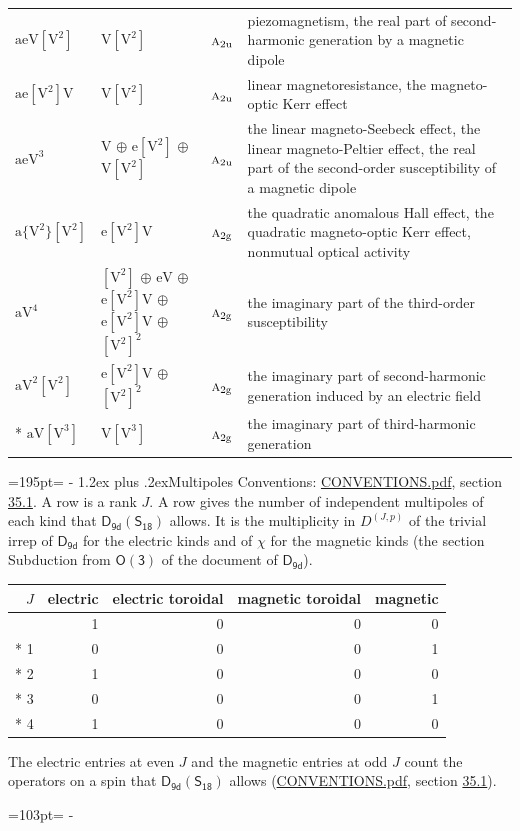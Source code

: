 \documentclass[10pt,a4paper]{article}
\makeatletter
\renewcommand\section{\@startsection{section}{1}{\z@}{-3ex plus -1ex minus -.2ex}%
  {1.2ex plus .2ex}{\normalfont\large\sffamily\bfseries\color{parttitle}}}
\newcommand{\needspace}[1]{\par\penalty-100\begingroup\dimen0=#1\relax\dimen2=\pagegoal
  \advance\dimen2-\pagetotal\ifdim\dimen0>\dimen2\relax\ifdim\dimen2>0pt\vfil\break\fi\fi
  \endgroup}
\numberwithin{equation}{section}
\newcommand{\grp}[1]{\mathsf{#1}}
\newcommand{\irr}[1]{\text{\normalfont\scshape #1}}
\newcommand{\ptag}[1]{\mathrm{#1}}
\newcommand{\irrJp}[2]{D^{(#1,#2)}}
\newcommand{\jahn}[1]{\mathrm{#1}}
\newlength{\fillwidth}\newlength{\cellwidth}\newlength{\colwidth}
\makeatother
\begin{document}
{\begin{longtable}{@{}lll>{\RaggedRight\arraybackslash}p{\fillwidth}@{}}
$\jahn{aeV[V^{2}]}$ & $\jahn{V[V^{2}]}$ & $\irr{a}_{2\ptag{u}}$ & piezomagnetism, the real part of second-harmonic generation by a magnetic dipole\\
$\jahn{ae[V^{2}]V}$ & $\jahn{V[V^{2}]}$ & $\irr{a}_{2\ptag{u}}$ & linear magnetoresistance, the magneto-optic Kerr effect\\
$\jahn{aeV^{3}}$ & $\jahn{V}$ $\oplus$ $\jahn{e[V^{2}]}$ $\oplus$ $\jahn{V[V^{2}]}$ & $\irr{a}_{2\ptag{u}}$ & the linear magneto-Seebeck effect, the linear magneto-Peltier effect, the real part of the second-order susceptibility of a magnetic dipole\\
$\jahn{a\{V^{2}\}[V^{2}]}$ & $\jahn{e[V^{2}]V}$ & $\irr{a}_{2\ptag{g}}$ & the quadratic anomalous Hall effect, the quadratic magneto-optic Kerr effect, nonmutual optical activity\\
$\jahn{aV^{4}}$ & $\jahn{[V^{2}]}$ $\oplus$ $\jahn{eV}$ $\oplus$ $\jahn{e[V^{2}]V}$ $\oplus$ $\jahn{e[V^{2}]V}$ $\oplus$ $\jahn{[V^{2}]^{2}}$ & $\irr{a}_{2\ptag{g}}$ & the imaginary part of the third-order susceptibility\\
$\jahn{aV^{2}[V^{2}]}$ & $\jahn{e[V^{2}]V}$ $\oplus$ $\jahn{[V^{2}]^{2}}$ & $\irr{a}_{2\ptag{g}}$ & the imaginary part of second-harmonic generation induced by an electric field\\*
$\jahn{aV[V^{3}]}$ & $\jahn{V[V^{3}]}$ & $\irr{a}_{2\ptag{g}}$ & the imaginary part of third-harmonic generation\\
\bottomrule\end{longtable}}
\needspace{195pt}
\section{Multipoles}\label{s:multipoles}
Conventions: \href{../../CONVENTIONS.pdf}{CONVENTIONS.pdf}, section \href{../../CONVENTIONS.pdf\#conv.35.1}{35.1}.
A row is a rank $J$. \label{n:head.multipole.electric}\label{n:head.multipole.electric.toroidal}\label{n:head.multipole.magnetic.toroidal}\label{n:head.multipole.magnetic}A row gives the number of independent multipoles of each kind that $\grp{D_{9d}}(\grp{S_{18}})$ allows. It is the multiplicity in $\irrJp{J}{p}$ of the trivial irrep of $\grp{D_{9d}}$ for the electric kinds and of $\chi$ for the magnetic kinds (the section Subduction from $\grp{O(3)}$ of the document of \href{../../../rotation/data/pdf/D9d.pdf}{$\grp{D_{9d}}$}).
{\small\begin{longtable}{@{}rrrrr@{}}\toprule
$J$ & electric & electric toroidal & magnetic toroidal & magnetic\\\midrule\endhead
\bottomrule\endfoot\endlastfoot
0 & 1 & 0 & 0 & 0\\*
1 & 0 & 0 & 0 & 1\\*
2 & 1 & 0 & 0 & 0\\*
3 & 0 & 0 & 0 & 1\\*
4 & 1 & 0 & 0 & 0\\
\bottomrule\end{longtable}}
The electric entries at even $J$ and the magnetic entries at odd $J$ count the operators on a spin that $\grp{D_{9d}}(\grp{S_{18}})$ allows (\href{../../CONVENTIONS.pdf}{CONVENTIONS.pdf}, section \href{../../CONVENTIONS.pdf\#conv.35.1}{35.1}).
\needspace{103pt}
\end{document}
